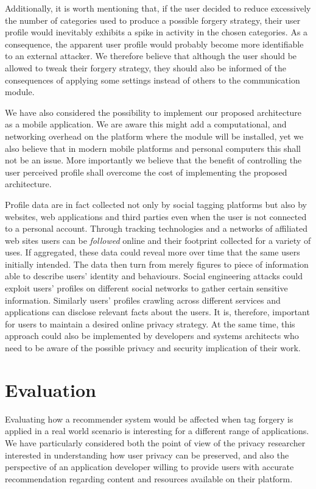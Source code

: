 Additionally, it is worth mentioning that, if the user decided to reduce excessively the number of categories used to produce a possible forgery strategy, their user profile would inevitably exhibits a spike in activity in the chosen categories. As a consequence, the apparent user profile would probably become more identifiable to an external attacker. We therefore believe that although the user should be allowed to tweak their forgery strategy, they should also be informed of the consequences of applying some settings instead of others to the communication module.

We have also considered the possibility to implement our proposed architecture as a mobile application. We are aware this might add a computational, and networking overhead on the platform where the module will be installed, yet we also believe that in modern mobile platforms and personal computers this shall not be an issue. More importantly we believe that the benefit of controlling the user perceived profile shall overcome the cost of implementing the proposed architecture.

Profile data are in fact collected not only by social tagging platforms but also by websites, web applications and third parties even when the user is not connected to a personal account. Through tracking technologies and a networks of affiliated web sites users can be \emph{followed} online and their footprint collected for a variety of uses.
If aggregated, these data could reveal more over time that the same users initially intended. The data then turn from merely figures to piece of information able to describe users' identity and behaviours. Social engineering attacks could exploit users' profiles on different social networks to gather certain sensitive information. Similarly users' profiles crawling across different services and applications can disclose relevant facts about the users. It is, therefore, important for users to maintain a desired online privacy strategy. At the same time, this approach could also be implemented by developers and systems architects who need to be aware of the possible privacy and security implication of their work.

\section{Evaluation}
\label{sec:evaluation}
\noindent
Evaluating how a recommender system would be affected when tag forgery is applied in a real world scenario is interesting for a different range of applications. We have particularly considered both the point of view of the privacy researcher interested in understanding how user privacy can be preserved, and also the perspective of an application developer willing to provide users with accurate recommendation regarding content and resources available on their platform.

